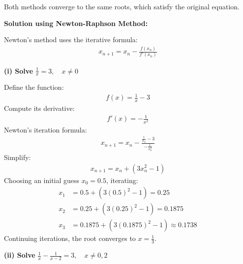 \documentclass[journal]{IEEEtran}
\begin{document}
Both methods converge to the same roots, which satisfy the original equation.

\textbf{Solution using Newton-Raphson Method:}

Newton's method uses the iterative formula:
\begin{align}
    x_{n+1} = x_n - \frac{f(x_n)}{f'(x_n)}
\end{align}

\textbf{(i) Solve } $\frac{1}{x} = 3, \quad x \neq 0$

Define the function:
\begin{align}
    f(x) = \frac{1}{x} - 3
\end{align}
Compute its derivative:
\begin{align}
    f'(x) = -\frac{1}{x^2}
\end{align}
Newton's iteration formula:
\begin{align}
    x_{n+1} = x_n - \frac{\frac{1}{x_n} - 3}{-\frac{1}{x_n^2}}
\end{align}
Simplify:
\begin{align}
    x_{n+1} = x_n + (3x_n^2 - 1)
\end{align}
Choosing an initial guess $x_0 = 0.5$, iterating:
\begin{align}
    x_1 &= 0.5 + (3(0.5)^2 - 1) = 0.25 \\
    x_2 &= 0.25 + (3(0.25)^2 - 1) = 0.1875 \\
    x_3 &= 0.1875 + (3(0.1875)^2 - 1) \approx 0.1738
\end{align}
Continuing iterations, the root converges to $x = \frac{1}{3}$.

\textbf{(ii) Solve } $\frac{1}{x} - \frac{1}{x-2} = 3, \quad x \neq 0,2$
\end{document}
